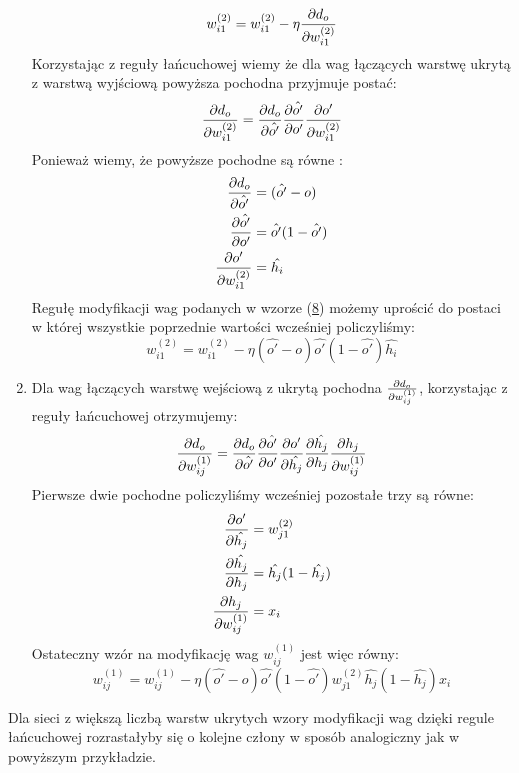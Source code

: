 \documentclass{article}
\begin{document}
\begin{enumerate}
\begin{equation}
	w_{i1}^{(2)} = w_{i1}^{(2)} - \eta \pdv{d_o}{w_{i1}^{(2)}}
\end{equation}
Korzystając z reguły łańcuchowej wiemy że dla wag łączących warstwę ukrytą z warstwą wyjściową
powyższa pochodna przyjmuje postać:
\begin{equation}
	\pdv{d_o}{w_{i1}^{(2)}} = \pdv{d_o}{\hat{o'}} \pdv{\hat{o'}}{o'} \pdv{o'}{w_{i1}^{(2)}}
\end{equation}
Ponieważ wiemy, że powyższe pochodne są równe \cite{um}:
\begin{align}
\begin{split} 
	\pdv{d_o}{\hat{o'}} &= (\hat{o'} - o) \\
	\pdv{\hat{o'}}{o'} &=\hat{o'}(1 - \hat{o'}) \\
	\pdv{o'}{w_{i1}^{(2)}} &= \hat{h_i}
\end{split}
\end{align}
Regułę modyfikacji wag podanych w wzorze (\hyperref[wz:8]{8}) możemy uprościć do postaci w której
wszystkie poprzednie wartości wcześniej policzyliśmy:
\begin{equation}
	w_{i1}^{(2)} = w_{i1}^{(2)} - \eta(\hat{o'} - o)\hat{o'}(1 - \hat{o'})\hat{h_i}
\end{equation}
\item Dla wag łączących warstwę wejściową z ukrytą pochodna $\pdv{d_o}{w_{ij}^{(1)}}$,
korzystając z reguły łańcuchowej otrzymujemy:
\begin{equation}
	\pdv{d_o}{w_{ij}^{(1)}} = \pdv{d_o}{\hat{o'}}\pdv{\hat{o'}}{o'}\pdv{o'}{\hat{h_j}}
	                          \pdv{\hat{h_j}}{h_j}\pdv{h_j}{w_{ij}^{(1)}}
\end{equation}
Pierwsze dwie pochodne policzyliśmy wcześniej pozostałe trzy są równe:
\begin{align}
\begin{split}
	\pdv{o'}{\hat{h_j}} &= w_{j1}^{(2)} \\
	\pdv{\hat{h_j}}{h_j} &= \hat{h_j}(1 - \hat{h_j})\\
	\pdv{h_j}{w_{ij}^{(1)}} &= x_i
\end{split}
\end{align}
Ostateczny wzór na modyfikację wag $w_{ij}^{(1)}$ jest więc równy:
\begin{equation}
	w_{ij}^{(1)} = w_{ij}^{(1)} - \eta (\hat{o'} - o)\hat{o'}(1 - \hat{o'})w_{j1}^{(2)}
	                                    \hat{h_j}(1 - \hat{h_j})x_i
\end{equation}
\end{enumerate}
Dla sieci z większą liczbą warstw ukrytych wzory modyfikacji wag dzięki regule łańcuchowej
rozrastałyby się o kolejne człony w sposób analogiczny jak w powyższym przykładzie.
\end{document}

